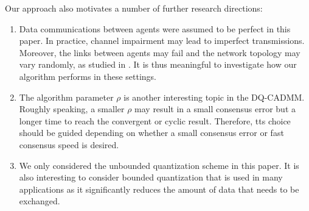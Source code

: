 \documentclass[journal]{IEEEtran}
\begin{document}
Our approach also motivates a number of further research directions:
\begin{enumerate}
\item Data communications between agents were assumed to be perfect in this paper. In practice, channel impairment may lead to imperfect transmissions. Moreover, the links between agents may fail and the network topology may vary randomly, as studied in \cite{Nedic2009,Zhu2009,Kar2010}. It is thus meaningful to investigate how our algorithm performs in these settings.
\item The algorithm parameter $\rho$ is another interesting topic in the DQ-CADMM. Roughly speaking, a smaller $\rho$ may result in a small consensus error but a longer time to reach the convergent or cyclic result. Therefore, tts choice should be guided depending on whether a small consensus error or fast consensus speed is desired.
\item We only considered the unbounded quantization scheme in this paper. It is also interesting to consider bounded quantization that is used in many applications as it significantly reduces the amount of data that needs to be exchanged.
\end{enumerate}
\appendices
\end{document}

